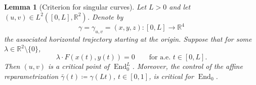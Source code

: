 \documentclass[11pt]{amsart}
\newtheorem{lemma}[theorem]{Lemma}
\numberwithin{equation}{section}
\theoremstyle{remark}
\newcommand{\R}{\mathbb R}
\newcommand{\End}{\operatorname{End}}
\begin{document}
\begin{lemma}[Criterion for singular curves]\label{lem:abnormal}
Let $L>0$ and let $(u,v)\in L^2([0,L],\R^2)$.  Denote by
\begin{equation}
 \gamma=\gamma_{u,v}=(x,y,z):[0,L]\longrightarrow\R^4
\end{equation}
the associated horizontal trajectory starting at the origin.  Suppose that for some 
$\lambda \in\R^2\setminus\{0\}$,
\begin{equation}
 \lambda\cdot F(x(t),y(t))=0
 \qquad\text{for a.e. }t\in[0,L].
\end{equation}
Then $(u,v)$ is a critical point of $\End_0^L$.  Moreover, the
control of the affine reparametrization
$\bar\gamma(t)\coloneq \gamma(Lt)$, $t\in[0,1]$, is critical for $\End_0$.
\end{lemma}
\end{document}
